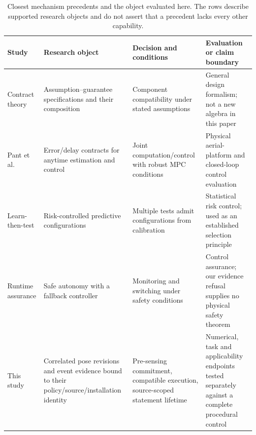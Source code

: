 \begin{table}[t]\centering\footnotesize
\caption{Closest mechanism precedents and the object evaluated here. The rows describe supported research objects and do not assert that a precedent lacks every other capability.}\label{tab:mechanism-precedents}
\begin{tabularx}{\linewidth}{@{}p{.20\linewidth}XXX@{}}\toprule
Study & Research object & Decision and conditions & Evaluation or claim boundary\\\midrule
Contract theory \cite{benveniste2018contracts} & Assumption--guarantee specifications and their composition & Component compatibility under stated assumptions & General design formalism; not a new algebra in this paper\\
Pant et al. \cite{pant2021} & Error/delay contracts for anytime estimation and control & Joint computation/control with robust MPC conditions & Physical aerial-platform and closed-loop control evaluation\\
Learn-then-test \cite{angelopoulos2025ltt} & Risk-controlled predictive configurations & Multiple tests admit configurations from calibration & Statistical risk control; used as an established selection principle\\
Runtime assurance \cite{mehmood2022simplex} & Safe autonomy with a fallback controller & Monitoring and switching under safety conditions & Control assurance; our evidence refusal supplies no physical safety theorem\\
This study & Correlated pose revisions and event evidence bound to their policy/source/installation identity & Pre-sensing commitment, compatible execution, source-scoped statement lifetime & Numerical, task and applicability endpoints tested separately against a complete procedural control\\\bottomrule
\end{tabularx}
\end{table}
